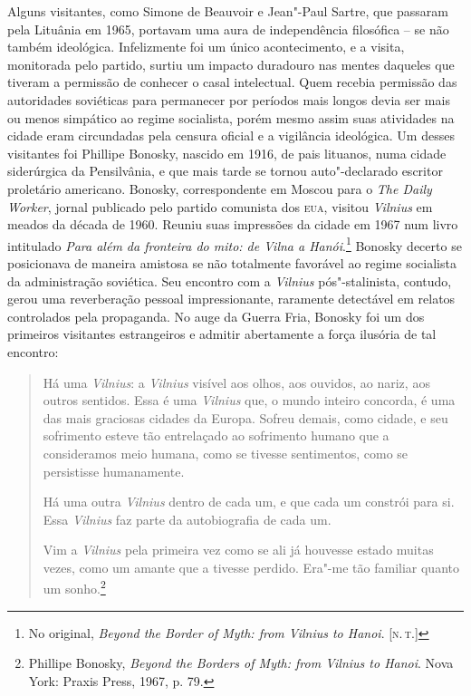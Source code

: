 Alguns visitantes, como Simone de Beauvoir e Jean"-Paul Sartre, que passaram
pela Lituânia em 1965, portavam uma aura de independência filosófica -- se
não também ideológica. Infelizmente foi um único acontecimento, e a
visita, monitorada pelo partido, surtiu um impacto duradouro nas mentes
daqueles que tiveram a permissão de conhecer o casal intelectual. Quem
recebia permissão das autoridades soviéticas para permanecer por
períodos mais longos devia ser mais ou menos simpático ao regime
socialista, porém mesmo assim suas atividades na cidade eram circundadas
pela censura oficial e a vigilância ideológica. Um desses visitantes foi
Phillipe Bonosky, nascido em 1916, de pais lituanos, numa cidade
siderúrgica da Pensilvânia, e que mais tarde se tornou auto"-declarado
escritor proletário americano. Bonosky, correspondente em Moscou para o
\textit{The Daily Worker}, jornal publicado pelo partido comunista dos
\textsc{eua}, visitou \textit{Vilnius} em meados da década de 1960. Reuniu suas impressões
da cidade em 1967 num livro intitulado \textit{Para além da fronteira do mito: de Vilna a Hanói}.\footnote{No original, \textit{Beyond the Border of Myth: from \textit{Vilnius} to Hanoi}. [\textsc{n.\,t.}]} Bonosky decerto se posicionava de maneira amistosa se não totalmente favorável ao regime socialista da administração
soviética. Seu encontro com a \textit{Vilnius} pós"-stalinista, contudo, gerou uma
reverberação pessoal impressionante, raramente detectável em relatos
controlados pela propaganda. No auge da Guerra Fria, Bonosky foi um dos
primeiros visitantes estrangeiros e admitir abertamente a força ilusória
de tal encontro:

\begin{quote}
Há uma \textit{Vilnius}: a \textit{Vilnius} visível aos olhos, aos ouvidos, ao nariz, aos
outros sentidos. Essa é uma \textit{Vilnius} que, o mundo inteiro concorda, é uma
das mais graciosas cidades da Europa. Sofreu demais, como cidade, e seu
sofrimento esteve tão entrelaçado ao sofrimento humano que a
consideramos meio humana, como se tivesse sentimentos, como se
persistisse humanamente.

Há uma outra \textit{Vilnius} dentro de cada um, e que cada um constrói para si.
Essa \textit{Vilnius} faz parte da autobiografia de cada um.

Vim a \textit{Vilnius} pela primeira vez como se ali já houvesse estado muitas
vezes, como um amante que a tivesse perdido. Era"-me tão familiar quanto
um sonho.\footnote{Phillipe Bonosky, \textit{Beyond the Borders of Myth: from \textit{Vilnius} to Hanoi}. Nova York: Praxis Press, 1967, p. 79.} \end{quote}

